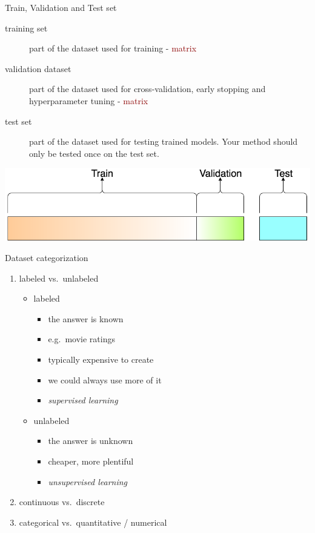 \documentclass[bigger]{beamer}
\begin{document}
\begin{frame}{Train, Validation and Test set}
	\begin{description}
	 \item[training set] part of the dataset used for training - \textcolor{darkred}{matrix} 
	\item[validation dataset] part of the dataset used for cross-validation, early stopping and hyperparameter tuning - \textcolor{darkred}{matrix} 
	\item[test set] part of the dataset used for testing trained models. Your method should only be tested once on the test set.
	\end{description}
	\centering
	\includegraphics[width=.8\textwidth]{fig/train}
\end{frame}

\begin{frame}{Dataset categorization}
    \begin{enumerate}
        \item labeled vs.~unlabeled
            \begin{itemize}
                \item labeled
                    \begin{itemize}
                        \item the answer is known
                        \item e.g.~movie ratings
                        \item typically expensive to create
                        \item we could always use more of it
                        \item \emph{supervised learning}
                    \end{itemize}
                \item unlabeled
                    \begin{itemize}
                        \item the answer is unknown
                        \item cheaper, more plentiful
                        \item \emph{unsupervised learning}
                    \end{itemize}
            \end{itemize}
        \item continuous vs.~discrete
        \item categorical vs.~quantitative / numerical
    \end{enumerate}
\end{frame}
\end{document}
